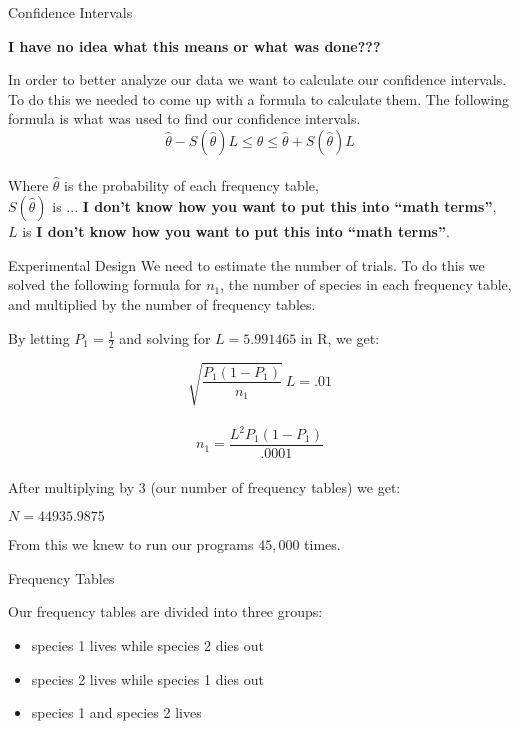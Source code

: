 \begin{frame}{Confidence Intervals}

  \textbf{I have no idea what this means or what was done???}

  In order to better analyze our data we want to calculate our
  confidence intervals. To do this we needed to come up with a formula to calculate them. The following formula is what was used to find our confidence intervals. \\

  $$\hat{\theta} - S(\hat{\theta}) L \leq \theta \leq \hat{\theta} + S(\hat{\theta}) L$$ \\

		Where $\hat{\theta}$ is the probability of each frequency table, \\
		$S(\hat{\theta})$ is ... \textbf{I don't know how you want to put this into ``math terms''}, \\ 
		$L$ is \textbf{I don't know how you want to put this into ``math terms''}.
\end{frame}

\begin{frame}{Experimental Design}
  We need to estimate the number of trials. To do this we solved the following formula for $n_1$, the number of species in each frequency table, and multiplied by the number of frequency tables. 
	
\vfill

By letting $P_1 = \frac{1}{2}$ and solving for $L = 5.991465$ in R, we get:

  $$\sqrt{\frac{P_1 (1-P_1)}{n_1}} \ L = .01$$ \\
  $$n_1 = \frac{L^2 P_1 (1-P_1)}{.0001}$$ \\
  After multiplying by $3$ (our number of frequency tables) we get: \\
  \begin{center} 
    $N = 44935.9875$ 
  \end{center} 

  From this we knew to run our programs $45,000$ times. 
	
\vfill

\end{frame}

\begin{frame}{Frequency Tables}

		Our frequency tables are divided into three groups:
\begin{itemize}
	\item species 1 lives while species 2 dies out
	\item species 2 lives while species 1 dies out
	\item species 1 and species 2 lives
\end{itemize}
\end{frame}


